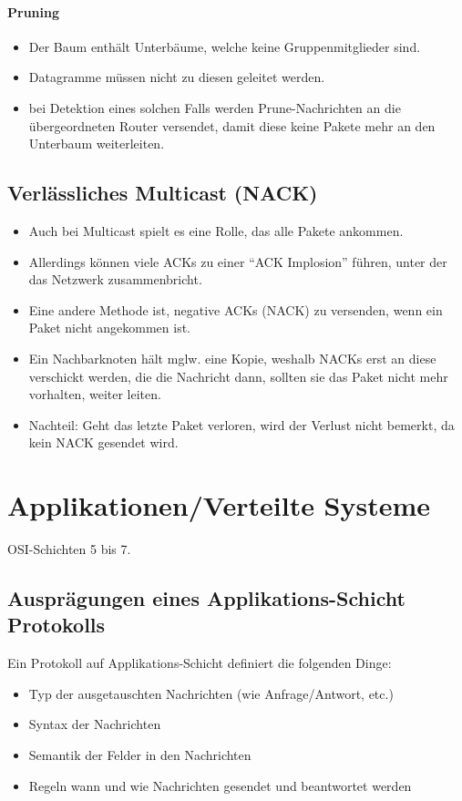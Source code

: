 \documentclass[a4paper, 11pt, accentcolor = tud3b]{tudreport}
\begin{document}
                \subsubsection{Pruning}
                    \begin{itemize}
                    	\item Der Baum enthält Unterbäume, welche keine Gruppenmitglieder sind.
                    	\item Datagramme müssen nicht zu diesen geleitet werden.
                    	\item bei Detektion eines solchen Falls werden Prune-Nachrichten an die übergeordneten Router versendet, damit diese keine Pakete mehr an den Unterbaum weiterleiten.
                    \end{itemize}

        \section{Verlässliches Multicast (NACK)}
	        \begin{itemize}
	        	\item Auch bei Multicast spielt es eine Rolle, das alle Pakete ankommen.
	        	\item Allerdings können viele ACKs zu einer \enquote{ACK Implosion} führen, unter der das Netzwerk zusammenbricht.
	        	\item Eine andere Methode ist, negative ACKs (NACK) zu versenden, wenn ein Paket nicht angekommen ist.
	        	\item Ein Nachbarknoten hält mglw. eine Kopie, weshalb NACKs erst an diese verschickt werden, die die Nachricht dann, sollten sie das Paket nicht mehr vorhalten, weiter leiten.
	        	\item Nachteil: Geht das letzte Paket verloren, wird der Verlust nicht bemerkt, da kein NACK gesendet wird.
	        \end{itemize}

    \chapter{Applikationen/Verteilte Systeme}
	    OSI-Schichten 5 bis 7.

        \section{Ausprägungen eines Applikations-Schicht Protokolls}
            Ein Protokoll auf Applikations-Schicht definiert die folgenden Dinge:
            \begin{itemize}
            	\item Typ der ausgetauschten Nachrichten (wie Anfrage/Antwort, etc.)
            	\item Syntax der Nachrichten
            	\item Semantik der Felder in den Nachrichten
            	\item Regeln wann und wie Nachrichten gesendet und beantwortet werden
            \end{itemize}
\end{document}

